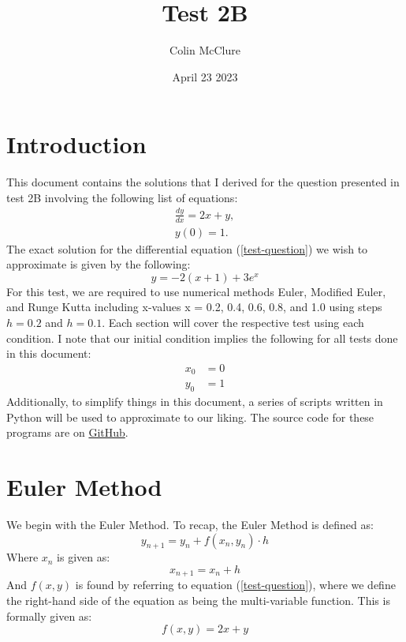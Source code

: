 \documentclass{article}
\title{Test 2B}
\author{Colin McClure}
\date{April 23 2023}
\begin{document}
\maketitle

\section{Introduction}
This document contains the solutions that I derived for the question presented in test 2B involving the following list of equations:
\begin{equation} \label{test-question}
    \begin{split}
        \frac{dy}{dx} = 2x+y, \\
        y(0) = 1.
    \end{split}
\end{equation}
The exact solution for the differential equation (\ref{test-question}) we wish to approximate is given by the following:
\begin{equation} \label{diff-eq-solution}
    y=-2(x + 1)+3e^x
\end{equation}
For this test, we are required to use numerical methods Euler, Modified Euler, and Runge Kutta including x-values x = 0.2, 0.4, 0.6, 0.8, and 1.0 using steps $h=0.2$ and $h=0.1$. Each section will cover the respective test using each condition. I note that our initial condition implies the following for all tests done in this document:
\begin{equation} \label{init-values}
    \begin{split}
        x_0 &= 0 \\
        y_0 &= 1
    \end{split}
\end{equation}
Additionally, to simplify things in this document, a series of scripts written in Python will be used to approximate to our liking. The source code for these programs are on \href{https://github.com/colinmc513/approximation-scripts}{GitHub}.
\section{Euler Method}
We begin with the Euler Method. To recap, the Euler Method is defined as:
\begin{equation} \label{euler}
    y_{n+1}=y_n+f(x_n,y_n)\cdot h
\end{equation}
Where $x_n$ is given as:
\begin{equation} \label{euler-x-val}
    x_{n+1}=x_n+h
\end{equation}
And $f(x,y)$ is found by referring to equation (\ref{test-question}), where we define the right-hand side of the equation as being the multi-variable function. This is formally given as:
\begin{equation} \label{euler-function}
    f(x,y)=2x+y
\end{equation}
\end{document}
